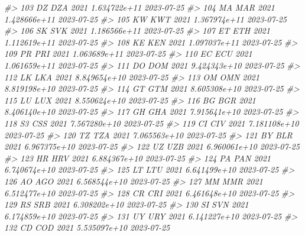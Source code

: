 \documentclass[
  xelatex, ja=standard]{bxjsbook}
\newenvironment{Shaded}{\begin{snugshade}}{\end{snugshade}}
\newcommand{\CommentTok}[1]{\textcolor[rgb]{0.56,0.35,0.01}{\textit{#1}}}
\theoremstyle{definition}
\theoremstyle{definition}
\theoremstyle{definition}
\theoremstyle{definition}
\theoremstyle{remark}
\begin{document}
\begin{Shaded}
\begin{Highlighting}[]
\CommentTok{\#\textgreater{} 103    DZ   DZA 2021 1.634722e+11         2023{-}07{-}25}
\CommentTok{\#\textgreater{} 104    MA   MAR 2021 1.428666e+11         2023{-}07{-}25}
\CommentTok{\#\textgreater{} 105    KW   KWT 2021 1.367974e+11         2023{-}07{-}25}
\CommentTok{\#\textgreater{} 106    SK   SVK 2021 1.186566e+11         2023{-}07{-}25}
\CommentTok{\#\textgreater{} 107    ET   ETH 2021 1.112619e+11         2023{-}07{-}25}
\CommentTok{\#\textgreater{} 108    KE   KEN 2021 1.097037e+11         2023{-}07{-}25}
\CommentTok{\#\textgreater{} 109    PR   PRI 2021 1.063689e+11         2023{-}07{-}25}
\CommentTok{\#\textgreater{} 110    EC   ECU 2021 1.061659e+11         2023{-}07{-}25}
\CommentTok{\#\textgreater{} 111    DO   DOM 2021 9.424343e+10         2023{-}07{-}25}
\CommentTok{\#\textgreater{} 112    LK   LKA 2021 8.849654e+10         2023{-}07{-}25}
\CommentTok{\#\textgreater{} 113    OM   OMN 2021 8.819198e+10         2023{-}07{-}25}
\CommentTok{\#\textgreater{} 114    GT   GTM 2021 8.605308e+10         2023{-}07{-}25}
\CommentTok{\#\textgreater{} 115    LU   LUX 2021 8.550624e+10         2023{-}07{-}25}
\CommentTok{\#\textgreater{} 116    BG   BGR 2021 8.406140e+10         2023{-}07{-}25}
\CommentTok{\#\textgreater{} 117    GH   GHA 2021 7.915641e+10         2023{-}07{-}25}
\CommentTok{\#\textgreater{} 118    S3   CSS 2021 7.567280e+10         2023{-}07{-}25}
\CommentTok{\#\textgreater{} 119    CI   CIV 2021 7.181108e+10         2023{-}07{-}25}
\CommentTok{\#\textgreater{} 120    TZ   TZA 2021 7.065563e+10         2023{-}07{-}25}
\CommentTok{\#\textgreater{} 121    BY   BLR 2021 6.967375e+10         2023{-}07{-}25}
\CommentTok{\#\textgreater{} 122    UZ   UZB 2021 6.960061e+10         2023{-}07{-}25}
\CommentTok{\#\textgreater{} 123    HR   HRV 2021 6.884367e+10         2023{-}07{-}25}
\CommentTok{\#\textgreater{} 124    PA   PAN 2021 6.740674e+10         2023{-}07{-}25}
\CommentTok{\#\textgreater{} 125    LT   LTU 2021 6.641499e+10         2023{-}07{-}25}
\CommentTok{\#\textgreater{} 126    AO   AGO 2021 6.568544e+10         2023{-}07{-}25}
\CommentTok{\#\textgreater{} 127    MM   MMR 2021 6.512477e+10         2023{-}07{-}25}
\CommentTok{\#\textgreater{} 128    CR   CRI 2021 6.461648e+10         2023{-}07{-}25}
\CommentTok{\#\textgreater{} 129    RS   SRB 2021 6.308202e+10         2023{-}07{-}25}
\CommentTok{\#\textgreater{} 130    SI   SVN 2021 6.174859e+10         2023{-}07{-}25}
\CommentTok{\#\textgreater{} 131    UY   URY 2021 6.141227e+10         2023{-}07{-}25}
\CommentTok{\#\textgreater{} 132    CD   COD 2021 5.535097e+10         2023{-}07{-}25}

\end{Highlighting}
\end{Shaded}
\end{document}
